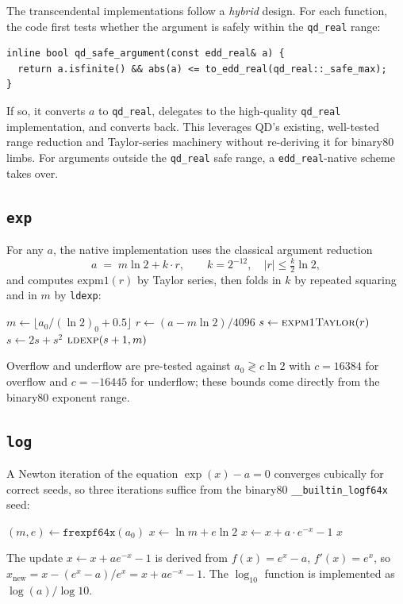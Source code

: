 \documentclass[11pt,a4paper]{article}
\begin{document}
The transcendental implementations follow a \emph{hybrid} design.
For each function, the code first tests whether the argument is
safely within the \texttt{qd\_real} range:
\begin{lstlisting}
inline bool qd_safe_argument(const edd_real& a) {
  return a.isfinite() && abs(a) <= to_edd_real(qd_real::_safe_max);
}
\end{lstlisting}
If so, it converts $a$ to \texttt{qd\_real}, delegates to the
high-quality \texttt{qd\_real} implementation, and converts back.
This leverages QD's existing, well-tested range reduction and
Taylor-series machinery without re-deriving it for binary80 limbs.
For arguments outside the \texttt{qd\_real} safe range, a
\texttt{edd\_real}-native scheme takes over.

\subsection{\texttt{exp}}

For any $a$, the native implementation uses the classical
argument reduction
\[
  a \;=\; m \ln 2 + k \cdot r, \qquad
  k = 2^{-12}, \quad |r| \le \tfrac{k}{2}\ln 2,
\]
and computes $\mathrm{expm1}(r)$ by Taylor series,
then folds in $k$ by repeated squaring and in $m$ by
\texttt{ldexp}:
\begin{algorithmic}[1]
\State $m \gets \lfloor a_0 / (\ln 2)_0 + 0.5 \rfloor$
\State $r \gets (a - m \ln 2) / 4096$
\State $s \gets \textsc{expm1Taylor}(r)$
  \State $s \gets 2s + s^2$ 
\EndFor
\State \Return $\textsc{ldexp}(s + 1, m)$
\end{algorithmic}
Overflow and underflow are pre-tested against $a_0 \gtrless
c \ln 2$ with $c = 16384$ for overflow and $c = -16445$ for
underflow; these bounds come directly from the binary80 exponent
range.

\subsection{\texttt{log}}

A Newton iteration of the equation $\exp(x) - a = 0$ converges
cubically for correct seeds, so three iterations suffice from
the binary80 \verb|__builtin_logf64x| seed:
\begin{algorithmic}[1]
\State $(m, e) \gets \texttt{frexpf64x}(a_0)$
\State $x \gets \ln m + e \ln 2$
  \State $x \gets x + a \cdot e^{-x} - 1$
\EndFor
\State \Return $x$
\end{algorithmic}
The update $x \gets x + a e^{-x} - 1$ is derived from
$f(x) = e^x - a$, $f'(x) = e^x$, so $x_{\mathrm{new}} = x -
(e^x - a)/e^x = x + ae^{-x} - 1$.  The $\log_{10}$ function is
implemented as $\log(a) / \log 10$.
\end{document}
